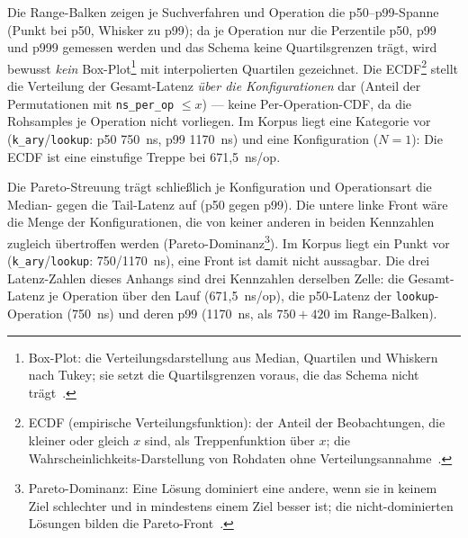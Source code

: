Die Range-Balken zeigen je Suchverfahren und Operation die p50--p99-Spanne (Punkt bei p50, Whisker
zu p99); da je Operation nur die Perzentile p50, p99 und p999 gemessen werden und das Schema keine
Quartilsgrenzen trägt, wird bewusst \emph{kein}
Box-Plot\footnote{Box-Plot: die Verteilungsdarstellung aus Median, Quartilen und Whiskern nach
Tukey; sie setzt die Quartilsgrenzen voraus, die das Schema nicht trägt~\cite{mcgill1978boxplots}.}
mit interpolierten Quartilen gezeichnet. Die ECDF\footnote{ECDF (empirische Verteilungsfunktion):
der Anteil der Beobachtungen, die kleiner oder gleich $x$ sind, als Treppenfunktion über $x$; die
Wahrscheinlichkeits-Darstellung von Rohdaten ohne Verteilungsannahme~\cite{wilk1968probability}.}
stellt die Verteilung der Gesamt-Latenz \emph{über die Konfigurationen} dar (Anteil der Permutationen
mit \texttt{ns\_per\_op} $\le x$) --- keine Per-Operation-CDF, da die Rohsamples je Operation nicht
vorliegen. Im Korpus liegt eine Kategorie vor (\texttt{k\_ary}/\texttt{lookup}: p50 750~ns, p99
1170~ns) und eine Konfiguration ($N = 1$): Die ECDF ist eine einstufige Treppe bei 671,5~ns/op.


Die Pareto-Streuung trägt schließlich je Konfiguration und Operationsart die Median- gegen die
Tail-Latenz auf (p50 gegen p99). Die untere linke Front wäre die Menge der Konfigurationen, die von
keiner anderen in beiden Kennzahlen zugleich übertroffen werden
(Pareto-Dominanz\footnote{Pareto-Dominanz: Eine Lösung dominiert eine andere, wenn sie in keinem
Ziel schlechter und in mindestens einem Ziel besser ist; die nicht-dominierten Lösungen bilden die
Pareto-Front~\cite{emmerich2018multiobjective,ehrgott2005multicriteria}.}). Im Korpus liegt ein
Punkt vor (\texttt{k\_ary}/\texttt{lookup}: 750/1170~ns), eine Front ist damit nicht aussagbar. Die
drei Latenz-Zahlen dieses Anhangs sind drei Kennzahlen derselben Zelle: die Gesamt-Latenz je
Operation über den Lauf (671,5~ns/op), die p50-Latenz der \texttt{lookup}-Operation (750~ns) und
deren p99 (1170~ns, als $750 + 420$ im Range-Balken).


